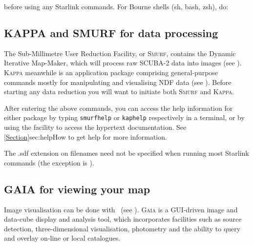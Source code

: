 \begin{terminalv}
\end{terminalv}

before using any Starlink commands. For Bourne shells (sh, bash, zsh), do:

\begin{terminalv}
\end{terminalv}

\subsection{KAPPA and SMURF for data processing}
\label{sec:packinit}

The Sub-Millimetre User Reduction Facility, or \textsc{Smurf},
contains the Dynamic Iterative Map-Maker, which will process raw
SCUBA-2 data into images (see \smurfsun). \textsc{Kappa} meanwhile is
an application package comprising general-purpose commands mostly for
manipulating and visualising NDF data (see \kappasun). Before starting
any data reduction you will want to initiate both \textsc{Smurf} and
\textsc{Kappa}.

\begin{terminalv}
\end{terminalv}

After entering the above commands, you can access the help information
for either package by typing \texttt{smurfhelp} or
\texttt{kaphelp} respectively in a terminal, or by using the
 facility to access the hypertext documentation. See
\cref{Section}{sec:help}{How to get help} for more information.



\begin{tip}
The .sdf extension on filenames need not be specified when running most
Starlink commands (the exception is \picard).
\end{tip}


\subsection{GAIA for viewing your map}

Image visualisation can be done with \gaia\ (see
\gaiasun). \textsc{Gaia} is a GUI-driven image and data-cube display and
analysis tool, which incorporates facilities such as source detection,
three-dimensional visualisation, photometry and the ability to query
and overlay on-line or local catalogues.
\begin{terminalv}
\end{terminalv}

